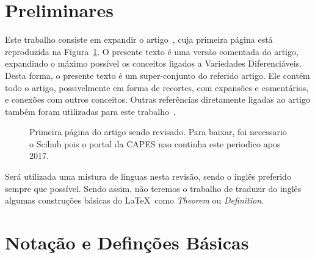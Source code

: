 \documentclass[a4paper,titlepage]{article}
\renewcommand{\headrulewidth}{0pt}%
\begin{document}



\tableofcontents
\newpage




\pagestyle{fancy}


\section{Preliminares}

Este trabalho consiste em expandir o artigo~\cite{Pennec:AnnStat:2018},
cuja primeira página está reproduzida na Figura~\ref{fig:paper:page1}.
O presente texto é uma versão comentada do artigo,
expandindo o máximo possível os conceitos ligados a Variedades Diferenciáveis.
Desta forma, o presente texto é um super-conjunto do referido artigo.
Ele contém todo o artigo, possivelmente em forma de recortes, com expansões e
comentários, e conexões com outros conceitos. Outras referências diretamente
ligadas ao artigo também foram utilizadas para este
trabalho~\cite{Pennec:Advances:Chapter:2020,Sommer:Pennec:etal:2020}.

\begin{figure}
\centering
{}
\caption{%
Primeira página do artigo sendo revisado. Para baixar, foi necessario o Scihub
pois o portal da CAPES nao continha este periodico apos 2017.
}\label{fig:paper:page1}
\end{figure}

Será utilizada uma mistura de línguas nesta revisão, sendo o inglês preferido
sempre que possível. Sendo assim, não teremos o trabalho de traduzir do inglês
algumas construções básicas do \LaTeX\ como \emph{Theorem} ou
\emph{Definition}.


\section{Notação e Definções Básicas}\label{sec:notation}
\end{document}
